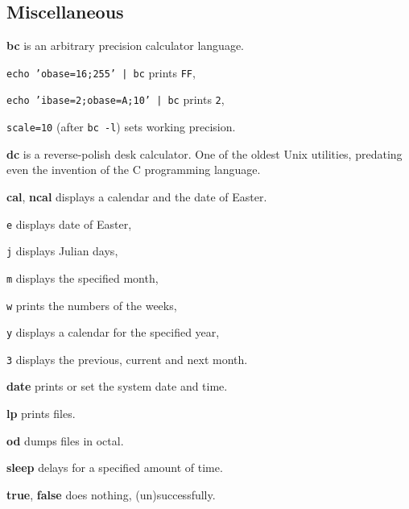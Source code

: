 \subsection{Miscellaneous}
\textbf{bc} is an arbitrary precision calculator language.
\begin{enumx}
	\item \texttt{echo 'obase=16;255' | bc} prints \texttt{FF},
	\item \texttt{echo 'ibase=2;obase=A;10' | bc} prints \texttt{2},
	\item \texttt{scale=10} (after \texttt{bc -l}) sets working precision.
\end{enumx}

\textbf{dc} is a reverse-polish desk calculator.
One of the oldest Unix utilities, 
predating even the invention of the C programming language.

\textbf{cal}, \textbf{ncal} displays a calendar and the date of Easter.
\begin{enumx}
	\item [\texttt{e}] displays date of Easter,
	\item [\texttt{j}] displays Julian days,
	\item [\texttt{m}] displays the specified month,
	\item [\texttt{w}] prints the numbers of the weeks,
	\item [\texttt{y}] displays a calendar for the specified year,
	\item [\texttt{3}] displays the previous, current and next month.
\end{enumx}

\textbf{date} prints or set the system date and time.


\textbf{lp} prints files.

\textbf{od} dumps files in octal.

\textbf{sleep} delays for a specified amount of time.

\textbf{true}, \textbf{false} does nothing, (un)successfully.
